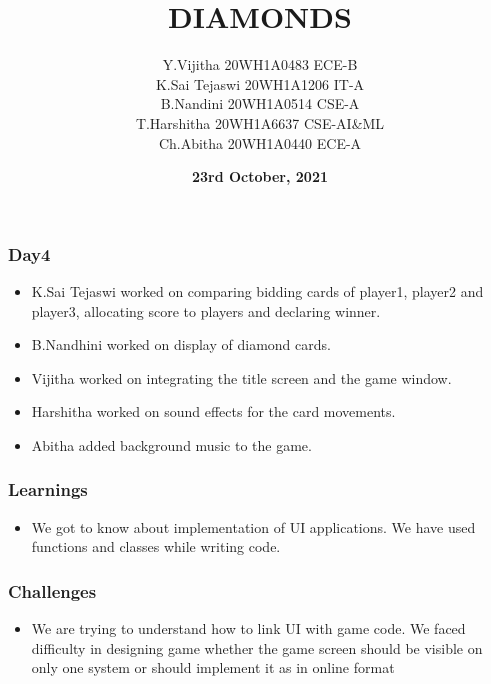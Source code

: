 \documentclass[12pt]{beamer}
\title{\textbf{DIAMONDS}}
\author[Bvrith]{Y.Vijitha 20WH1A0483 ECE-B\\K.Sai Tejaswi 20WH1A1206 IT-A\\ B.Nandini 20WH1A0514 CSE-A\\ T.Harshitha 20WH1A6637 CSE-AI&ML\\ Ch.Abitha 20WH1A0440 ECE-A}
\date{\textbf{23rd October, 2021}}
\begin{document}
    \begin{frame}
        \titlepage
    \end{frame}
	    \begin{frame}
	\frametitle{Day4}
	\begin{itemize}
	    \item K.Sai Tejaswi worked on comparing bidding cards of player1, player2 and player3, allocating score to players and declaring winner.
	    \item B.Nandhini worked on display of diamond cards.
	    \item Vijitha worked on integrating the title screen and the game window.
	    \item Harshitha worked on sound effects for the card movements.
	    \item Abitha added background music to the game.
	    \end{itemize}
	    \end{frame}
    \begin{frame}
        \frametitle{Learnings}
	\begin{itemize}
	    \item We got to know about implementation of UI applications. We have used functions and classes while writing code. 
	\end{itemize}
    \end{frame}
    \begin{frame}
	\frametitle{Challenges}
        \begin{itemize}
	    \item We are trying to understand how to link UI with game code. We faced difficulty in designing game whether the game screen should be visible on only one system or should implement it as in online format
        \end{itemize}
    \end{frame}
\end{document}
